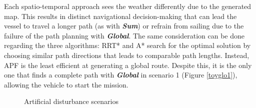 Each spatio-temporal approach sees the weather differently due to the generated map. This results in distinct navigational decision-making that can lead the vessel to travel a longer path (as with \textbf{\textit{Sum}}) or refrain from sailing due to the failure of the path planning with \textbf{\textit{Global}}.
The same consideration can be done regarding the three algorithms: RRT* and A* search for the optimal solution by choosing similar path directions that leads to comparable path lengths. Instead, APF is the least efficient at generating a global route. Despite this, it is the only one that finds a complete path with \textbf{\textit{Global}} in scenario 1 (Figure \ref{toyglo1}), allowing the vehicle to start the mission.
\begin{figure}[h]
	\centering 
	\hspace{0.1cm}
	\hspace{0.1cm}
	\hspace{0.1cm}
	\hspace{0.1cm}
	\hspace{0.1cm}
	\hspace{0.1cm}
	\hspace{0.1cm}
	\hspace{0.1cm}
	\vspace{0.0cm}
	\caption{Artificial disturbance scenarios} 
	\label{scenario123}
\end{figure}

